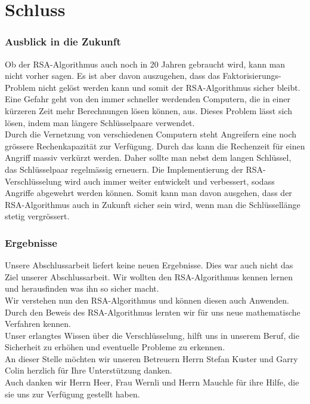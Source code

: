 \part{Schluss}
\section{Ausblick in die Zukunft}
Ob der RSA-Algorithmus auch noch in 20 Jahren gebraucht wird, kann man nicht vorher sagen. Es ist aber davon auszugehen, dass das Faktorisierungs-Problem nicht gelöst werden kann und somit der RSA-Algorithmus sicher bleibt.\\
Eine Gefahr geht von den immer schneller werdenden Computern, die in einer kürzeren Zeit mehr Berechnungen lösen können, aus. Dieses Problem lässt sich lösen, indem man längere Schlüsselpaare verwendet.\\
Durch die Vernetzung von verschiedenen Computern steht Angreifern eine noch grössere Rechenkapazität zur Verfügung. Durch das kann die Rechenzeit für einen Angriff massiv verkürzt werden. Daher sollte man nebst dem langen Schlüssel,  das Schlüsselpaar regelmässig erneuern.
%
Die Implementierung der RSA-Verschlüsselung wird auch immer weiter entwickelt und verbessert, sodass Angriffe abgewehrt werden können.
Somit kann man davon ausgehen, dass der RSA-Algorithmus auch in Zukunft sicher sein wird, wenn man die Schlüssellänge stetig vergrössert.
\section{Ergebnisse}
Unsere Abschlussarbeit liefert keine neuen Ergebnisse. Dies war auch nicht das Ziel unserer Abschlussarbeit. Wir wollten den RSA-Algorithmus kennen lernen und herausfinden was ihn so sicher macht.\\
Wir verstehen nun den RSA-Algorithmus und können diesen auch Anwenden. Durch den Beweis des RSA-Algorithmus lernten wir für uns neue mathematische Verfahren kennen.\\
Unser erlangtes Wissen über die Verschlüsselung, hilft uns in unserem Beruf, die Sicherheit zu erhöhen und eventuelle Probleme zu erkennen.
%
\\[2ex]
An dieser Stelle möchten wir unseren Betreuern Herrn Stefan Kuster und Garry Colin herzlich für Ihre Unterstützung danken.\\
Auch danken wir Herrn Heer, Frau Wernli und Herrn Mauchle für ihre Hilfe, die sie uns zur Verfügung gestellt haben.
\newpage
